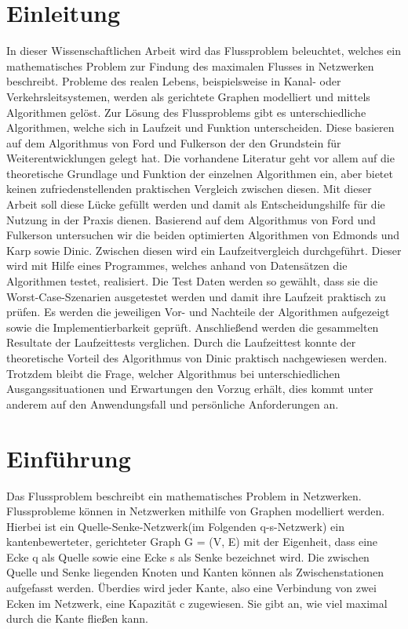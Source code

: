 \documentclass[runningheads,a4paper]{llncs}
\begin{document}
\section{Einleitung}
\label{Einleitung}

In dieser Wissenschaftlichen Arbeit wird das Flussproblem beleuchtet, welches ein mathematisches Problem zur Findung des maximalen Flusses in Netzwerken beschreibt.
 Probleme des realen Lebens, beispielsweise in Kanal- oder Verkehrsleitsystemen, werden als gerichtete Graphen modelliert und mittels Algorithmen gelöst.
 Zur Lösung des Flussproblems gibt es unterschiedliche Algorithmen, welche sich in Laufzeit und Funktion unterscheiden. Diese basieren auf dem Algorithmus von Ford und Fulkerson der den Grundstein für Weiterentwicklungen gelegt hat.
 Die vorhandene Literatur geht vor allem auf die theoretische Grundlage und Funktion der einzelnen Algorithmen ein,  aber bietet keinen zufriedenstellenden praktischen Vergleich zwischen diesen.
 Mit dieser Arbeit soll diese Lücke gefüllt werden und damit als Entscheidungshilfe für die Nutzung in der Praxis dienen.
Basierend auf dem Algorithmus von Ford und Fulkerson untersuchen wir die beiden optimierten Algorithmen von Edmonds und Karp sowie Dinic.
Zwischen diesen wird ein Laufzeitvergleich durchgeführt.
Dieser wird mit Hilfe eines Programmes, welches anhand von Datensätzen die Algorithmen testet, realisiert.
Die Test Daten werden so gewählt, dass sie die Worst-Case-Szenarien ausgetestet werden und damit ihre Laufzeit praktisch zu prüfen.
Es werden die jeweiligen Vor- und Nachteile der Algorithmen aufgezeigt sowie die Implementierbarkeit geprüft. Anschließend werden die gesammelten Resultate der Laufzeittests verglichen.
Durch die Laufzeittest konnte der theoretische Vorteil des Algorithmus von Dinic praktisch nachgewiesen werden.
 Trotzdem bleibt die Frage, welcher Algorithmus bei unterschiedlichen Ausgangssituationen und Erwartungen den Vorzug erhält, dies kommt unter anderem auf den Anwendungsfall und persönliche Anforderungen an.

\section{Einführung}
\label{Einfuehrung}
Das Flussproblem beschreibt ein mathematisches Problem in Netzwerken.\\

Flussprobleme k\"onnen in Netzwerken mithilfe von Graphen modelliert werden. Hierbei ist ein Quelle-Senke-Netzwerk(im Folgenden q-s-Netzwerk) ein kantenbewerteter, gerichteter Graph G = (V, E) mit der Eigenheit, dass eine Ecke q als Quelle sowie eine Ecke s als Senke bezeichnet wird. Die zwischen Quelle und Senke liegenden Knoten und Kanten können als Zwischenstationen aufgefasst werden. \"Uberdies wird jeder Kante, also eine Verbindung von zwei Ecken im Netzwerk, eine Kapazität c zugewiesen. Sie gibt an, wie viel maximal durch die Kante fließen kann. \citep{Testref}
\end{document}
